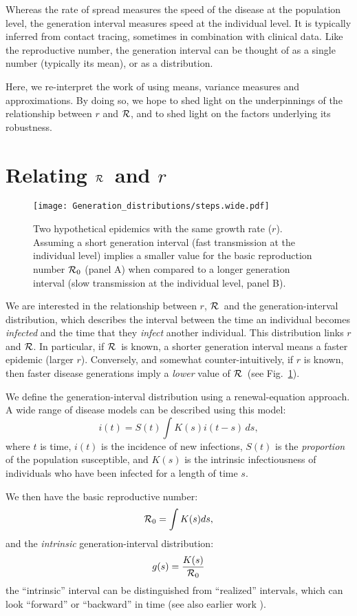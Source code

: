 \documentclass[12pt,]{article}
\newcommand{\RR}{\ensuremath{{\cal R}}}
\newcommand{\Rx}[1]{\ensuremath{{\cal R}_{#1}}}
\newcommand{\Ro}{\Rx{0}}
\newcommand{\fref}[1]{Fig.~\ref{fig:#1}}
\begin{document}
Whereas the rate of spread measures the speed of the disease at the population level, the generation interval measures speed at the individual level.
It is typically inferred from contact tracing, sometimes in combination with clinical data.
Like the reproductive number, the generation interval can be thought of as a single number (typically its mean), or as a distribution.

Here, we re-interpret the work of \cite{WallLips07} using means, variance measures and approximations.
By doing so, we hope to shed light on the underpinnings of the relationship between $r$ and \RR, and to shed light on the factors underlying its robustness.

\section{Relating \RR\ and $r$}

\begin{figure}[htbp] \centering
	\texttt{[image: Generation\_distributions/steps.wide.pdf]}
	\caption{Two hypothetical epidemics with the same growth rate ($r$).  Assuming a short generation interval (fast transmission at the individual level) implies a smaller value for the basic reproduction number $\Ro$ (panel A) when compared to a longer generation interval (slow transmission at the individual level, panel B).
	\label{fig:link}}
\end{figure}

We are interested in the relationship between $r$, \RR~and the generation-interval distribution, which describes the interval between the time an individual becomes \emph{infected} and the time that they \emph{infect} another individual.
This distribution links $r$ and \RR. In particular, if \RR~is known, a shorter generation interval means a faster epidemic (larger $r$). Conversely, and somewhat counter-intuitively, if $r$ is known, then faster disease generations imply a \emph{lower} value of \RR~(see \fref{link}).

We define the generation-interval distribution using a renewal-equation approach.
A wide range of disease models can be described using this model: $$i(t) = S(t)\int{K(s)i(t-s) \,ds},$$ where $t$ is time, $i(t)$ is the incidence of new infections, $S(t)$ is the \emph{proportion} of the population susceptible, and $K(s)$ is the intrinsic infectiousness of individuals who have been infected for a length of time $s$.

We then have the basic reproductive number: $$\Ro = \int{K(s)ds},$$ and the \emph{intrinsic} generation-interval distribution: $$g(s) = \frac{K(s)}{\Ro}$$ the ``intrinsic'' interval can be distinguished from ``realized'' intervals, which can look ``forward'' or ``backward'' in time \cite{ChamDush15} (see also earlier work \cite{Sven07,Nish10}).
\end{document}
